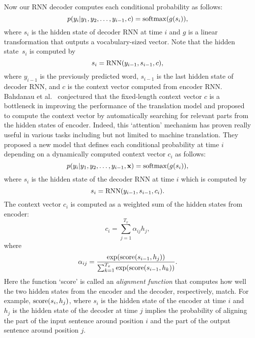 \documentclass[10pt,twocolumn,letterpaper]{article}
\begin{document}
Now our RNN decoder computes each conditional probability as follows:
\[
p(y_i | y_1, y_2, \ldots, y_{i-1}, c) = {\rm softmax}(g(s_{i})),
\]
where $s_i$ is the hidden state of decoder RNN at time $i$ and $g$ is a linear transformation 
that outputs a vocabulary-sized vector.
Note that the hidden state~$s_i$ is computed by
\[
s_i = {\rm RNN}(y_{i-1},s_{i-1}, c),
\]
where $y_{i-1}$ is the previously predicted word, $s_{i-1}$ is the last hidden state of decoder RNN, and $c$ is the context vector computed from encoder RNN.\\

 Bahdanau et al.~\cite{BahdanauCB14} conjectured that the fixed-length context vector $c$ is a bottleneck in improving the performance of the translation model and proposed to compute the context vector by automatically searching for relevant parts from the hidden states of encoder. Indeed, this `attention' mechanism has proven really useful in various tasks including but not limited to machine translation. They proposed a new model that defines each conditional probability at time $i$ depending on a dynamically computed context vector $c_i$ as follows:
\[
p(y_i | y_1, y_2, \ldots, y_{i-1}, {\bf x}) = {\rm softmax}(g(s_i)),
\]
where $s_i$ is the hidden state of the decoder RNN at time $i$ which is computed by
\[
s_i = {\rm RNN}(y_{i-1}, s_{i-1}, c_i).
\]
The context vector $c_i$ is computed as a weighted sum of the hidden states from encoder:
\[
c_i = \sum_{j=1}^{T_x} \alpha_{ij} h_j,
\]
where
\[
\alpha_{ij} = \frac{\exp ({\rm score}(s_{i-1}, h_j))}{\sum_{k=1}^{T_x} \exp({\rm score}(s_{i-1}, h_k))}.
\]
Here the function `score' is called an {\em alignment function} that computes how well the two hidden states from the encoder and the decoder, respectively, match. For example, ${\rm score}(s_i, h_j)$, where $s_i$ is the hidden state of the encoder at time $i$ and $h_j$ is the hidden state of the decoder at time $j$ implies the probability of aligning the part of the input sentence around position $i$ and the part of the output sentence around position $j$.
\\
\end{document}
